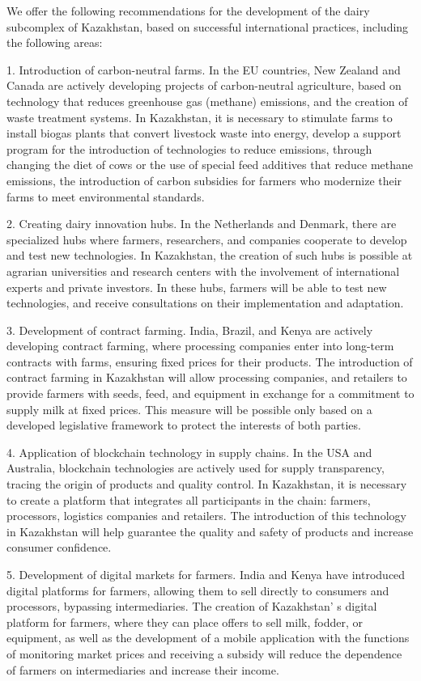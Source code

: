 \begin{multicols}{2}
We offer the following recommendations for the development of the dairy
subcomplex of Kazakhstan, based on successful international practices,
including the following areas:

1. Introduction of carbon-neutral farms. In the EU countries, New Zealand
and Canada are actively developing projects of carbon-neutral
agriculture, based on technology that reduces greenhouse gas (methane)
emissions, and the creation of waste treatment systems. In Kazakhstan,
it is necessary to stimulate farms to install biogas plants that
convert livestock waste into energy, develop a support program for the
introduction of technologies to reduce emissions, through changing the
diet of cows or the use of special feed additives that reduce methane
emissions, the introduction of carbon subsidies for farmers who
modernize their farms to meet environmental standards.

2. Creating dairy innovation hubs. In the Netherlands and Denmark, there
are specialized hubs where farmers, researchers, and companies
cooperate to develop and test new technologies. In Kazakhstan, the
creation of such hubs is possible at agrarian universities and
research centers with the involvement of international experts and
private investors. In these hubs, farmers will be able to test new
technologies, and receive consultations on their implementation and
adaptation.

3. Development of contract farming. India, Brazil, and Kenya are actively
developing contract farming, where processing companies enter into
long-term contracts with farms, ensuring fixed prices for their
products. The introduction of contract farming in Kazakhstan will
allow processing companies, and retailers to provide farmers with
seeds, feed, and equipment in exchange for a commitment to supply milk
at fixed prices. This measure will be possible only based on a
developed legislative framework to protect the interests of both
parties.

4. Application of blockchain technology in supply chains. In the USA and
Australia, blockchain technologies are actively used for supply
transparency, tracing the origin of products and quality control. In
Kazakhstan, it is necessary to create a platform that integrates all
participants in the chain: farmers, processors, logistics companies
and retailers. The introduction of this technology in Kazakhstan will
help guarantee the quality and safety of products and increase
consumer confidence.

5. Development of digital markets for farmers. India and Kenya have
introduced digital platforms for farmers, allowing them to sell
directly to consumers and processors, bypassing intermediaries. The
creation of Kazakhstan' s digital platform for farmers,
where they can place offers to sell milk, fodder, or equipment, as
well as the development of a mobile application with the functions of
monitoring market prices and receiving a subsidy will reduce the
dependence of farmers on intermediaries and increase their income.


\end{multicols}
